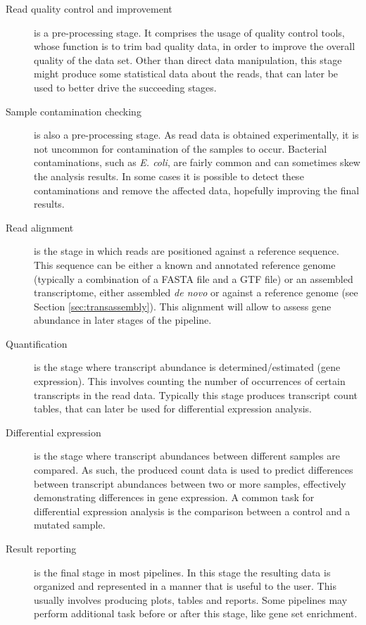 \begin{description}

  \item[Read quality control and improvement]
  is a pre-processing stage. It comprises the usage of quality control tools,
  whose function is to trim bad quality data, in order to improve the overall
  quality of the data set. Other than direct data manipulation, this stage might
  produce some statistical data about the reads, that can later be used to
  better drive the succeeding stages.

  \item[Sample contamination checking]
  is also a pre-processing stage. As read data is obtained experimentally, it is
  not uncommon for contamination of the samples to occur. Bacterial
  contaminations, such as \emph{E. coli}, are fairly common and can sometimes
  skew the analysis results. In some cases it is possible to detect these
  contaminations and remove the affected data, hopefully improving the final
  results.

  \item[Read alignment]
  is the stage in which reads are positioned against a reference sequence. This
  sequence can be either a known and annotated reference genome (typically a
  combination of a FASTA file and a GTF file) or an assembled transcriptome,
  either assembled \emph{de novo} or against a reference genome (see Section
  \ref{sec:transassembly}). This alignment will allow to assess gene abundance
  in later stages of the pipeline.

  \item[Quantification]
  is the stage where transcript abundance is determined/estimated (gene
  expression). This involves counting the number of occurrences of certain
  transcripts in the read data. Typically this stage produces transcript count
  tables, that can later be used for differential expression analysis.

  \item[Differential expression]
  is the stage where transcript abundances between different samples are
  compared. As such, the produced count data is used to predict differences
  between transcript abundances between two or more samples, effectively
  demonstrating differences in gene expression. A common task for differential
  expression analysis is the comparison between a control and a mutated sample.

  \item[Result reporting]
  is the final stage in most pipelines. In this stage the resulting data is
  organized and represented in a manner that is useful to the user. This usually
  involves producing plots, tables and reports. Some pipelines may perform
  additional task before or after this stage, like gene set enrichment.

\end{description}

